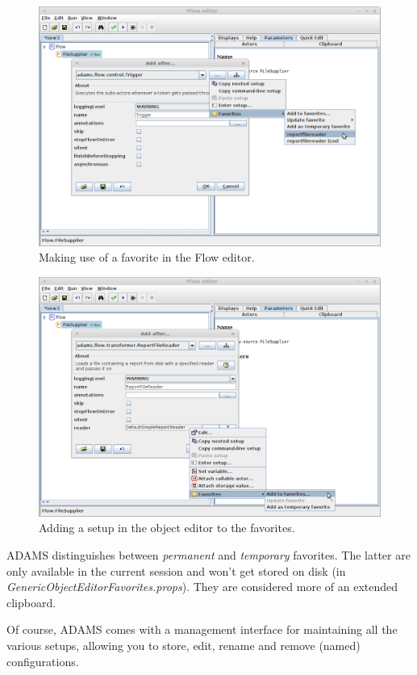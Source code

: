\begin{figure}[htb]
  \centering
  \includegraphics[width=12.0cm]{images/favorites-floweditor.png}
  \caption{Making use of a favorite in the Flow editor.}
  \label{favorites-floweditor}
\end{figure}

\begin{figure}[htb]
  \centering
  \includegraphics[width=12.0cm]{images/favorites-goe.png}
  \caption{Adding a setup in the object editor to the favorites.}
  \label{favorites-goe}
\end{figure}

ADAMS distinguishes between \textit{permanent} and \textit{temporary} favorites.
The latter are only available in the current session and won't get stored on 
disk (in \textit{GenericObjectEditorFavorites.props}). They are considered 
more of an extended clipboard.

Of course, ADAMS comes with a management interface for maintaining all the
various setups, allowing you to store, edit, rename and remove (named) 
configurations. 

